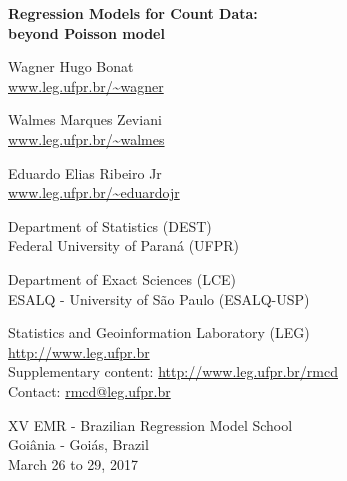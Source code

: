 \thispagestyle{empty}
\cleardoublepage
\thispagestyle{empty}


\begin{flushleft}
  \Large \bf
  Regression Models for Count Data:\\
  beyond Poisson model
\end{flushleft}
\vspace*{1.5em}

\begin{flushleft}
Wagner Hugo Bonat\footnotemark[1] \footnotemark[3]\\
\url{www.leg.ufpr.br/~wagner}

Walmes Marques Zeviani\footnotemark[1] \footnotemark[3]\\
\url{www.leg.ufpr.br/~walmes}

Eduardo Elias Ribeiro Jr\footnotemark[2] \footnotemark[3]\\
\url{www.leg.ufpr.br/~eduardojr}
\end{flushleft}
\vspace*{2em}


\footnotemark[1]Department of Statistics (DEST)\\
\hspace*{1.5mm}Federal University of Paraná (UFPR)

\footnotemark[2]Department of Exact Sciences (LCE)\\
\hspace*{1.5mm}ESALQ - University of São Paulo (ESALQ-USP)

\footnotemark[3]Statistics and Geoinformation Laboratory (LEG)\\
\hspace*{1.5mm}\url{http://www.leg.ufpr.br}\\

Supplementary content: \url{http://www.leg.ufpr.br/rmcd}\\
Contact: \url{rmcd@leg.ufpr.br}
\vspace*{\fill}

\begin{center}
XV EMR - Brazilian Regression Model School\\
Goiânia - Goiás, Brazil\\
March 26 to 29, 2017
\end{center}

\clearpage
\thispagestyle{empty}
\pagebreak

\setcounter{page}{1}
